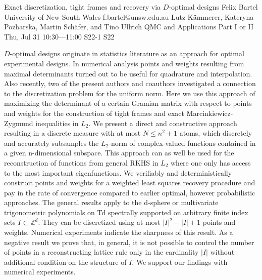 \begin{talk}
  {Exact discretization, tight frames and recovery via $D$-optimal designs}%
  {Felix Bartel}%
  {University of New South Wales}%
  {f.bartel@unsw.edu.au}%
  {Lutz K\"ammerer, Kateryna Pozharska, Martin Sch\"afer, and Tino Ullrich}%
  {QMC and Applications Part I or II}%
  {Thu, Jul 31 10:30---11:00}%
  {S22-1}%
  {S22}%
    
   
    $D$-optimal designs originate in statistics literature as an approach for optimal experimental designs. In numerical analysis points and weights resulting from maximal determinants turned out to be useful for quadrature and interpolation. Also recently, two of the present authors and coauthors investigated a connection to the discretization problem for the uniform norm. Here we use this approach of maximizing the determinant of a certain Gramian matrix with respect to points and weights for the construction of tight frames and exact Marcinkiewicz-Zygmund inequalities in $L_2$. We present a direct and constructive approach resulting in a discrete measure with at most $N\le n^2+1$ atoms, which discretely and accurately subsamples the $L_2$-norm of complex-valued functions contained in a given n-dimensional subspace. This approach can as well be used for the reconstruction of functions from general RKHS in $L_2$ where one only has access to the most important eigenfunctions. We verifiably and deterministically construct points and weights for a weighted least squares recovery procedure and pay in the rate of convergence compared to earlier optimal, however probabilistic approaches. The general results apply to the d-sphere or multivariate trigonometric polynomials on Td spectrally supported on arbitrary finite index sets $I\subset\mathbb Z^d$. They can be discretized using at most $|I|^2-|I|+1$ points and weights. Numerical experiments indicate the sharpness of this result. As a negative result we prove that, in general, it is not possible to control the number of points in a reconstructing lattice rule only in the cardinality $|I|$ without additional condition on the structure of $I$. We support our findings with numerical experiments.

\medskip

\end{talk}

